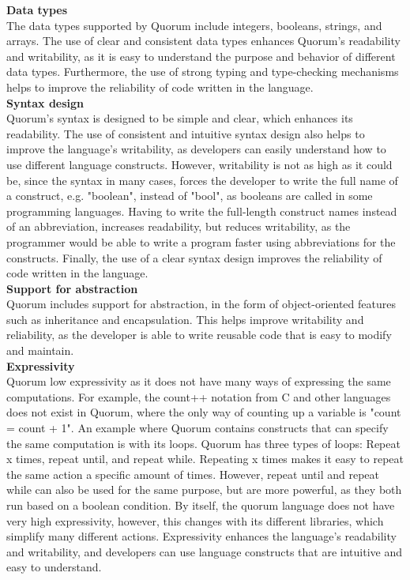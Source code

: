 \noindent\textbf{Data types}\\
\noindent The data types supported by Quorum include integers, booleans, strings, and arrays. The use of clear and consistent data types enhances Quorum's readability and writability, as it is easy to understand the purpose and behavior of different data types. Furthermore, the use of strong typing and type-checking mechanisms helps to improve the reliability of code written in the language.\\

\noindent\textbf{Syntax design}\\
\noindent Quorum's syntax is designed to be simple and clear, which enhances its readability. The use of consistent and intuitive syntax design also helps to improve the language's writability, as developers can easily understand how to use different language constructs. However, writability is not as high as it could be, since the syntax in many cases, forces the developer to write the full name of a construct, e.g. "boolean", instead of "bool", as booleans are called in some programming languages. Having to write the full-length construct names instead of an abbreviation, increases readability, but reduces writability, as the programmer would be able to write a program faster using abbreviations for the constructs. Finally, the use of a clear syntax design improves the reliability of code written in the language.\\

\noindent\textbf{Support for abstraction}\\
\noindent Quorum includes support for abstraction, in the form of object-oriented features such as inheritance and encapsulation. This helps improve writability and reliability, as the developer is able to write reusable code that is easy to modify and maintain.\\

\noindent\textbf{Expressivity}\\
\noindent Quorum low expressivity as it does not have many ways of expressing the same computations. For example, the count++ notation from C and other languages does not exist in Quorum, where the only way of counting up a variable is "count = count + 1". An example where Quorum contains constructs that can specify the same computation is with its loops. Quorum has three types of loops: Repeat x times, repeat until, and repeat while. Repeating x times makes it easy to repeat the same action a specific amount of times. However, repeat until and repeat while can also be used for the same purpose, but are more powerful, as they both run based on a boolean condition. By itself, the quorum language does not have very high expressivity, however, this changes with its different libraries, which simplify many different actions. Expressivity enhances the language's readability and writability, and developers can use language constructs that are intuitive and easy to understand.\\

